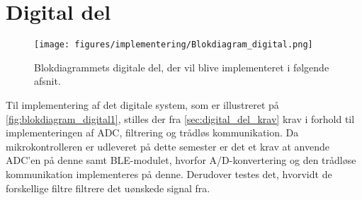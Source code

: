 \section{Digital del}

\begin{figure}[H]
\centering
\texttt{[image: figures/implementering/Blokdiagram\_digital.png]}
\caption{Blokdiagrammets digitale del, der vil blive implementeret i følgende afsnit.}
\label{fig:blokdiagram_digital1}
\end{figure}

Til implementering af det digitale system, som er illustreret på \autoref{fig:blokdiagram_digital1}, stilles der fra \autoref{sec:digital_del_krav} krav i forhold til implementeringen af ADC, filtrering og trådløs kommunikation. Da mikrokontrolleren er udleveret på dette semester er det et krav at anvende ADC'en på denne samt BLE-modulet, hvorfor A/D-konvertering og den trådløse kommunikation implementeres på denne. Derudover testes det, hvorvidt de forskellige filtre filtrere det uønskede signal fra. 



